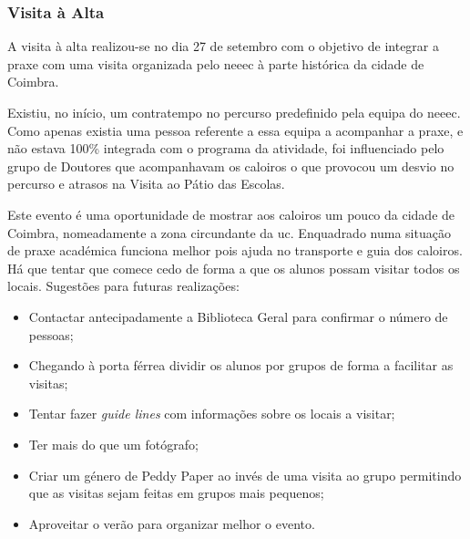 
\subsubsection{Visita à Alta }

A visita à alta realizou-se no dia 27 de setembro com o objetivo de integrar a praxe com uma visita organizada pelo \acrshort{neeec} à parte histórica da cidade de Coimbra.

Existiu, no início, um contratempo no percurso predefinido pela equipa do \acrshort{neeec}. Como apenas existia uma pessoa referente a essa equipa a acompanhar a praxe, e não estava 100\% integrada com o programa da atividade, foi influenciado pelo grupo de Doutores que acompanhavam os caloiros o que provocou um desvio no percurso e atrasos na Visita ao Pátio das Escolas.

Este evento é uma oportunidade de mostrar aos caloiros um pouco da cidade de Coimbra, nomeadamente a zona circundante da \acrlong{uc}. Enquadrado numa situação de praxe académica funciona melhor pois ajuda no transporte e guia dos caloiros. Há que tentar que comece cedo de forma a que os alunos possam visitar todos os locais.
Sugestões para futuras realizações:
\begin{itemize}
\item Contactar antecipadamente a Biblioteca Geral para confirmar o número de pessoas;
\item Chegando à porta férrea dividir os alunos por grupos de forma a facilitar as visitas;
\item Tentar fazer \textit{guide lines} com informações sobre os locais a visitar;
\item Ter mais do que um fotógrafo;
\item Criar um género de Peddy Paper ao invés de uma visita ao grupo permitindo que as visitas sejam feitas em grupos mais pequenos;
\item Aproveitar o verão para organizar melhor o evento.
\end{itemize}